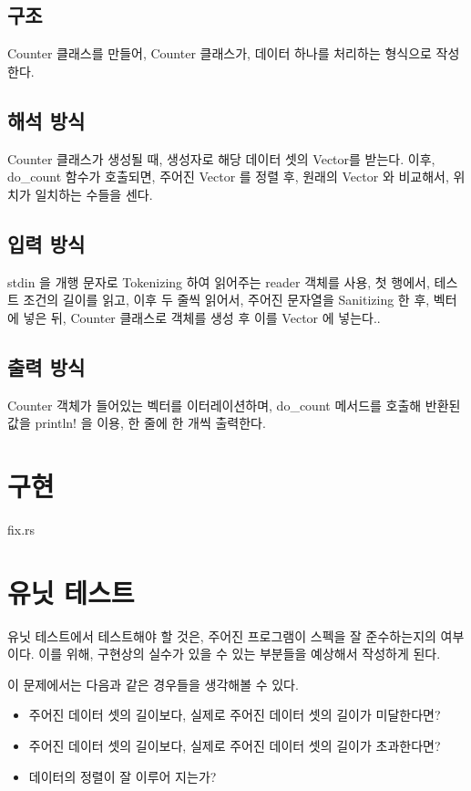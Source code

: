 \documentclass {article}
\begin{document}
\subsection {구조}
Counter 클래스를 만들어, Counter 클래스가, 데이터 하나를 처리하는 형식으로 작성한다.
\subsection {해석 방식}
Counter 클래스가 생성될 때, 생성자로 해당 데이터 셋의 Vector를 받는다. 이후,
do\_count 함수가 호출되면, 주어진 Vector 를 정렬 후, 원래의 Vector 와 비교해서,
위치가 일치하는 수들을 센다.

\subsection {입력 방식}
stdin 을 개행 문자로 Tokenizing 하여 읽어주는 reader 객체를 사용,
첫 행에서, 테스트 조건의 길이를 읽고, 이후 두 줄씩 읽어서, 주어진 문자열을
Sanitizing 한 후, 벡터에 넣은 뒤, Counter 클래스로 객체를 생성 후 이를
Vector 에 넣는다..

\subsection {출력 방식}
Counter 객체가 들어있는 벡터를 이터레이션하며, do\_count 메서드를
호출해 반환된 값을 println! 을 이용, 한 줄에 한 개씩 출력한다.

\section {구현}
{fix.rs}

\section {유닛 테스트}
유닛 테스트에서 테스트해야 할 것은, 주어진 프로그램이 스펙을 잘 준수하는지의
여부이다. 이를 위해, 구현상의 실수가 있을 수 있는 부분들을 예상해서 작성하게 된다.

이 문제에서는 다음과 같은 경우들을 생각해볼 수 있다.
\begin{itemize}
\item 주어진 데이터 셋의 길이보다, 실제로 주어진 데이터 셋의 길이가 미달한다면?
\item 주어진 데이터 셋의 길이보다, 실제로 주어진 데이터 셋의 길이가 초과한다면?
\item 데이터의 정렬이 잘 이루어 지는가?
\end{itemize}
\end{document}
